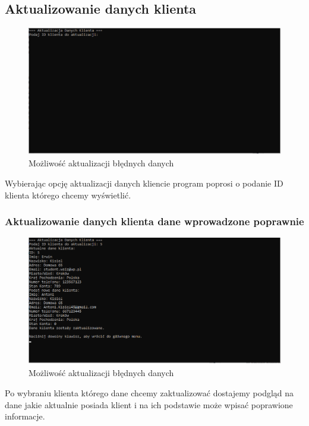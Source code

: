 \subsection{Aktualizowanie danych klienta}

\begin{figure}[h]
    \centering
    \includegraphics[width=\textwidth]{AktualizacjaDanych.png}
      \caption{Możliwość aktualizacji błędnych danych}
    \label{fig:example}
\end{figure}

Wybierając opcję aktualizacji danych kliencie program poprosi o podanie ID klienta którego chcemy wyświetlić.

\subsubsection{Aktualizowanie danych klienta dane wprowadzone poprawnie}

\begin{figure}[h]
    \centering
    \includegraphics[width=\textwidth]{AktualizacjaDanychPop.png}
      \caption{Możliwość aktualizacji błędnych danych}
    \label{fig:example}
\end{figure}

Po wybraniu klienta którego dane chcemy zaktualizować dostajemy podgląd na dane jakie aktualnie posiada klient i na ich podstawie może wpisać poprawione informacje. 

